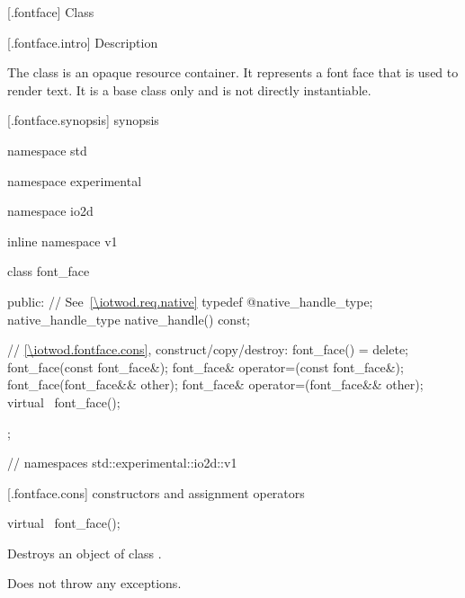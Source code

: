  [\iotwod.fontface] {Class }

 [\iotwod.fontface.intro] { Description}

\pnum
{}%
The  class is an opaque resource container. It represents a 
font face that is used to render text. It is a base class only and is not 
directly instantiable.

 [\iotwod.fontface.synopsis] { synopsis}

\begin{codeblock}
namespace std { namespace experimental { namespace io2d { inline namespace v1 {
  class font_face {
  public:
    // See~\ref{\iotwod.req.native}
    typedef @\impdef@ native_handle_type;
    native_handle_type native_handle() const;

    // \ref{\iotwod.fontface.cons}, construct/copy/destroy:
    font_face() = delete;
    font_face(const font_face&);
    font_face& operator=(const font_face&);
    font_face(font_face&& other);
    font_face& operator=(font_face&& other);
    virtual ~font_face();
  };
} } } } // namespaces std::experimental::io2d::v1
\end{codeblock}

 [\iotwod.fontface.cons] { constructors and 
assignment operators}

%
\begin{itemdecl}
virtual ~font_face();
\end{itemdecl}
\begin{itemdescr}
	\pnum
	\effects
	Destroys an object of class .
	
	\pnum
	\remarks
	Does not throw any exceptions.
\end{itemdescr}
